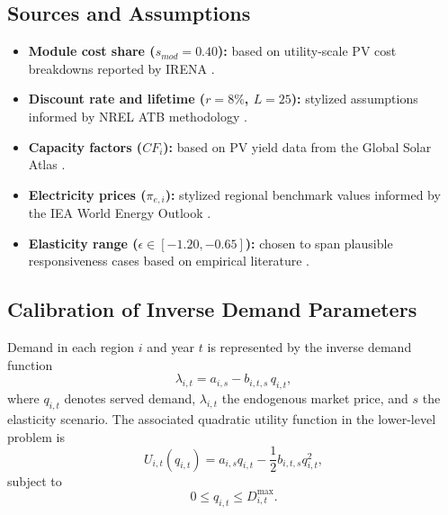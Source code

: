 \documentclass[11pt,a4paper]{article}
\begin{document}
\subsection*{Sources and Assumptions}
\begin{itemize}
    \item \textbf{Module cost share ($s_{mod}=0.40$):} based on utility-scale PV cost breakdowns reported by IRENA \cite{irena_cost_2024}.
    \item \textbf{Discount rate and lifetime ($r=8\%$, $L=25$):} stylized assumptions informed by NREL ATB methodology \cite{nrel_atb_2024}.
    \item \textbf{Capacity factors ($CF_i$):} based on PV yield data from the Global Solar Atlas \cite{globalsolaratlas}.
    \item \textbf{Electricity prices ($\pi_{e,i}$):} stylized regional benchmark values informed by the IEA World Energy Outlook \cite{iea_weo_2024}.
    \item \textbf{Elasticity range ($\epsilon \in [-1.20,-0.65]$):} chosen to span plausible responsiveness cases based on empirical literature \cite{gillingham_2018,hughes_2015}.
\end{itemize}






\subsection{Calibration of Inverse Demand Parameters}

Demand in each region \(i\) and year \(t\) is represented by the inverse demand function
\begin{equation}
\lambda_{i,t} = a_{i,s} - b_{i,t,s}\,q_{i,t},
\label{eq:inverse_demand}
\end{equation}
where \(q_{i,t}\) denotes served demand, \(\lambda_{i,t}\) the endogenous market price, and \(s\) the elasticity scenario. The associated quadratic utility function in the lower-level problem is
\begin{equation}
U_{i,t}(q_{i,t}) = a_{i,s}q_{i,t} - \frac{1}{2} b_{i,t,s} q_{i,t}^2,
\end{equation}
subject to
\begin{equation}
0 \le q_{i,t} \le D^{\max}_{i,t}.
\end{equation}
\end{document}
